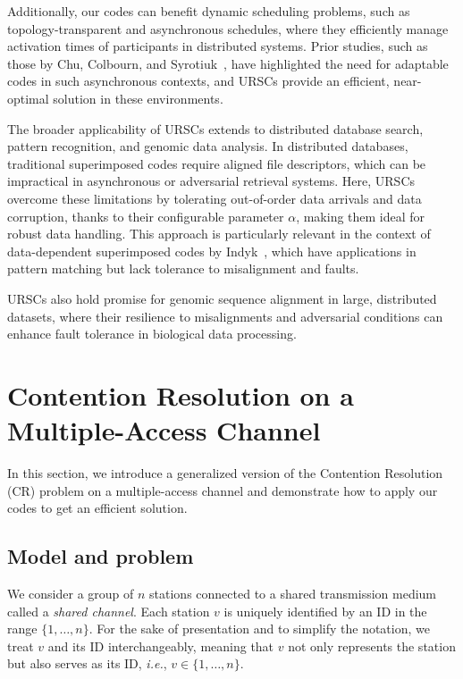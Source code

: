 \documentclass[11pt]{article}
\begin{document}
Additionally, our codes can benefit dynamic scheduling problems, such as topology-transparent 
and asynchronous schedules, 
where they efficiently manage activation times of participants in distributed systems. Prior studies, 
such as those by Chu, Colbourn, and Syrotiuk~\cite{CCSb2006, CCSa2006}, have highlighted the need 
for adaptable codes in such asynchronous contexts, and URSCs provide an efficient, near-optimal solution 
in these environments.
 
The broader applicability of URSCs extends to distributed database search, pattern recognition, 
and genomic data analysis. In distributed databases, traditional superimposed codes require aligned 
file descriptors, which can be impractical in asynchronous or adversarial retrieval systems. Here, 
URSCs overcome these limitations by tolerating out-of-order data arrivals and data corruption, thanks to 
their configurable parameter $\alpha$, making them ideal for robust data handling. 
This approach is particularly relevant in the context of data-dependent superimposed codes by
Indyk~\cite{I1997}, which have applications in pattern matching but lack tolerance to misalignment and faults.

URSCs also hold promise for genomic sequence alignment in large, distributed datasets, where their resilience to misalignments and adversarial conditions can enhance fault tolerance in biological data processing.





\section{Contention Resolution on a Multiple-Access Channel}
\label{sec:applications}

In this section, we 
introduce a generalized version of the Contention Resolution (CR) problem on a multiple-access channel and demonstrate how to apply our codes to get an efficient solution.


\subsection{Model and problem}
\label{sec:model-contention-resolution}

We consider a group of $n$ stations connected to a shared transmission medium called a \textit{shared channel}. 
Each station $v$ is uniquely identified by an ID in the range $\{1, \ldots, n\}$. 
For the sake of presentation and to simplify the notation, we treat $v$ and its ID interchangeably, 
meaning that $v$ not only represents the station but also serves as its ID, \textit{i.e.}, $v \in \{1, \ldots, n\}$.
\end{document}
